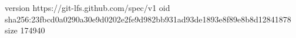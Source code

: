 version https://git-lfs.github.com/spec/v1
oid sha256:23fbcd0a0290a30e9d0202e2fe9d982bb931ad93de1893e8f89e8b8d12841878
size 174940
